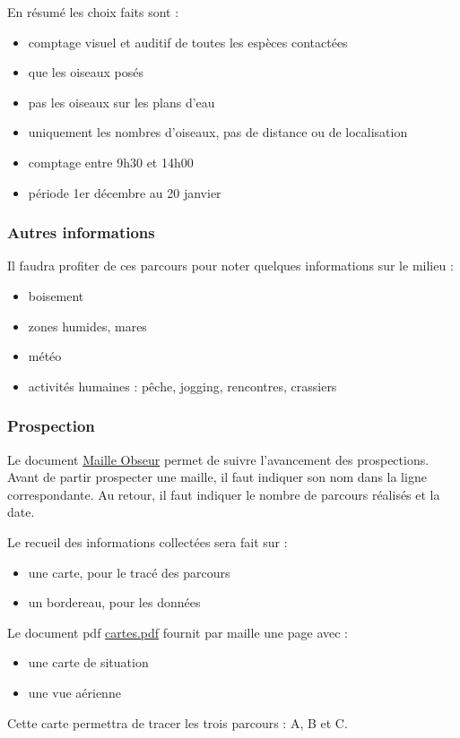 En résumé les choix faits sont :
\begin{itemize}
\item comptage visuel et auditif de toutes les espèces contactées
\item que les oiseaux posés
\item pas les oiseaux sur les plans d'eau
\item uniquement les nombres d'oiseaux, pas de distance ou de localisation
\item comptage entre 9h30 et 14h00
\item période 1er décembre au 20 janvier
\end{itemize}
\subsubsection*{Autres informations}
Il faudra profiter de ces parcours pour noter quelques informations sur le milieu :
\begin{itemize}
\item boisement
\item zones humides, mares
\item météo
\item activités humaines : pêche, jogging, rencontres, crassiers
\end{itemize}
\subsubsection*{Prospection}
Le document \href{https://docs.google.com/spreadsheets/d/10uaf6o8Xu8dBiizxhHWJxUXgdR-Iu6mg9Utc5pJgUBY/edit?usp=sharing}{Maille Obseur} permet de suivre l'avancement des prospections.
Avant de partir prospecter une maille, il faut indiquer son nom dans la ligne correspondante.
Au retour, il faut indiquer le nombre de parcours réalisés et la date.

Le recueil des informations collectées sera fait sur :
\begin{itemize}
\item une carte, pour le tracé des parcours
\item un bordereau, pour les données
\end{itemize}

Le document pdf \href{https://drive.google.com/open?id=0BzQEzw-5wGqta0pvZDRxVmtDZHM}{cartes.pdf} fournit par maille une page avec :
\begin{itemize}
\item une carte de situation
\item une vue aérienne
\end{itemize}
Cette carte permettra de tracer les trois parcours : A, B et C.

